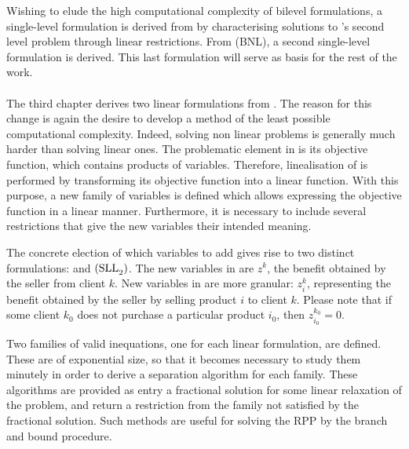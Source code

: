 Wishing to elude the high computational complexity of bilevel formulations, a
single-level formulation \bnl is derived from \bnlv by characterising solutions
to \bnlv's second level problem through linear restrictions. From (BNL), a
second single-level formulation \slnl is derived. This last formulation will
serve as basis for the rest of the work.

\paragraph*{}

The third chapter derives two linear formulations from \slnl. The reason for
this change is again the desire to develop a method of the least possible
computational complexity. Indeed, solving non linear problems is generally much
harder than solving linear ones. The problematic element in \slnl is its
objective function, which contains products of variables. Therefore,
linealisation of \slnl is performed by transforming its objective function into
a linear function. With this purpose, a new family of variables is defined which
allows expressing the objective function in a linear manner. Furthermore, it is
necessary to include several restrictions that give the new variables their
intended meaning.

The concrete election of which variables to add gives rise to two distinct
formulations: \slla and $\rm{(SLL}_2\rm{)}$. The new variables in \slla are
$z^k$, the benefit obtained by the seller from client $k$. New variables in
\sllb are more granular: $z^k_i$, representing the benefit obtained by the
seller by selling product $i$ to client $k$. Please note that if some client
$k_0$ does not purchase a particular product $i_0$, then $z_{i_0}^{k_0} = 0$.

Two families of valid inequations, one for each linear formulation, are defined.
These are of exponential size, so that it becomes necessary to study them
minutely in order to derive a separation algorithm for each family. These
algorithms are provided as entry a fractional solution for some linear
relaxation of the problem, and return a restriction from the family not
satisfied by the fractional solution. Such methods are useful for solving the
RPP by the branch and bound procedure.

\paragraph*{}

